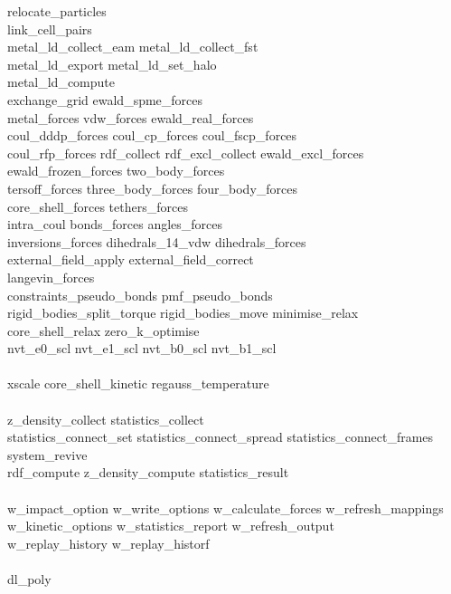 \begin{itemize}
{relocate\_particles \\
link\_cell\_pairs \\
metal\_ld\_collect\_eam metal\_ld\_collect\_fst \\
metal\_ld\_export metal\_ld\_set\_halo \\
metal\_ld\_compute \\
exchange\_grid ewald\_spme\_forces \\
metal\_forces vdw\_forces ewald\_real\_forces \\
coul\_dddp\_forces coul\_cp\_forces coul\_fscp\_forces \\
coul\_rfp\_forces rdf\_collect rdf\_excl\_collect ewald\_excl\_forces \\
ewald\_frozen\_forces two\_body\_forces \\
tersoff\_forces three\_body\_forces four\_body\_forces \\
core\_shell\_forces tethers\_forces \\
intra\_coul bonds\_forces angles\_forces \\
inversions\_forces dihedrals\_14\_vdw dihedrals\_forces \\
external\_field\_apply external\_field\_correct \\
langevin\_forces \\
constraints\_pseudo\_bonds pmf\_pseudo\_bonds \\
rigid\_bodies\_split\_torque rigid\_bodies\_move minimise\_relax \\
core\_shell\_relax zero\_k\_optimise \\
nvt\_e0\_scl nvt\_e1\_scl nvt\_b0\_scl nvt\_b1\_scl \\
\\
xscale core\_shell\_kinetic regauss\_temperature \\
\\
z\_density\_collect statistics\_collect \\
statistics\_connect\_set statistics\_connect\_spread statistics\_connect\_frames \\
system\_revive \\
rdf\_compute z\_density\_compute statistics\_result \\
\\
w\_impact\_option w\_write\_options w\_calculate\_forces w\_refresh\_mappings \\
w\_kinetic\_options w\_statistics\_report w\_refresh\_output \\
w\_replay\_history w\_replay\_historf \\
\\
dl\_poly}


\end{itemize}
